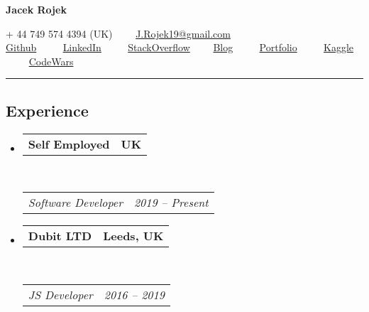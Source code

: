 \documentclass[10pt,letterpaper]{article}
\makeatletter
\newcommand{\headerrow}[2]
{\begin{tabular*}{\linewidth}{l@{\extracolsep{\fill}}r}
	#1 &
	#2 \\
\end{tabular*}}
\makeatother
\begin{document}
\begin{center}
{\LARGE \textbf{Jacek Rojek}}
\end{center}
\begin{center}
+ 44 749 574 4394 (UK)\ \ \textbullet
\ \ \href{mailto:j.rojek19@gmail.com}{J.Rojek19@gmail.com}
\\
\href{https://github.com/JacekRojek}{Github} \ \ \textbullet
\ \ \href{https://www.linkedin.com/in/jacek-rojek-b7a396105/}{LinkedIn} \ \ \textbullet
\ \ \href{https://stackoverflow.com/users/4375103/jacek-rojek}{StackOverflow}\ \ \textbullet
\ \ \href{https://indiedevart.wordpress.com/}{Blog} \ \ \textbullet
\ \ \href{https://jacekrojek.github.io/JacekRojek-Portfolio/}{Portfolio} \ \ \textbullet
\ \ \href{https://www.kaggle.com/jacek123}{Kaggle} \ \ \textbullet
\ \ \href{https://www.codewars.com/users/JacekRojek}{CodeWars}

\end{center}

\hrule
\vspace{-0.4em}
\subsection*{Experience}

\begin{itemize}
	\parskip=0.1em

  \item
	\headerrow
		{\textbf{Self Employed}}
		{\textbf{UK}}
	\\
	\headerrow
		{\emph{Software Developer}}
		{\emph{2019 -- Present}}

	\item
	\headerrow
		{\textbf{Dubit LTD}}
		{\textbf{Leeds, UK}}
	\\
	\headerrow
		{\emph{JS Developer}}
		{\emph{2016 -- 2019}}
\end{itemize}
\end{document}
